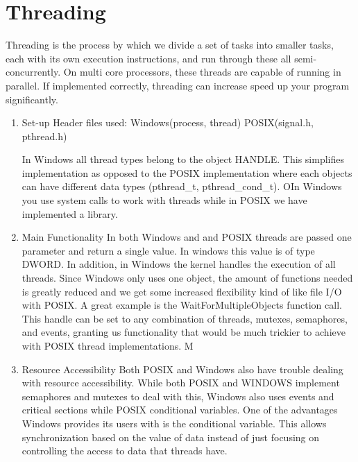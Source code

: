 \documentclass[letterpaper,10pt,titlepage]{article}
\begin{document}
\section{Threading} 
	Threading is the process by which we divide a set of tasks into smaller tasks, each with its own execution instructions, 
and run through these all semi-concurrently. On multi core processors, these threads are capable of running in parallel.
If implemented correctly, threading can increase speed up your program significantly. 

\begin{enumerate}
  \item Set-up \newline
Header files used: Windows(process, thread)			POSIX(signal.h, pthread.h)
	
	In Windows all thread types belong to the object HANDLE. This simplifies implementation as opposed to 
the POSIX implementation where each objects can have different data types (pthread\_t, pthread\_cond\_t). 
OIn Windows you use system calls to work with threads while in POSIX we have implemented a library.


  \item Main Functionality \newline
	In both Windows and and POSIX threads are passed one parameter and return a single value. In windows
this value is of type DWORD. In addition, in Windows the kernel handles the execution of all threads. 
Since Windows only uses one object, the amount of functions needed is greatly reduced
and we get some increased flexibility kind of like file I/O with POSIX. A great example is the WaitForMultipleObjects function call.
This handle can be set to any combination of threads, mutexes, semaphores, and events, granting us functionality that
would be much trickier to achieve with POSIX thread implementations. M

  \item Resource Accessibility \newline
Both POSIX and Windows also have trouble dealing with resource accessibility. While both POSIX
and WINDOWS implement semaphores and mutexes to deal with this, Windows also uses events and critical sections while POSIX 
conditional variables. One of the advantages Windows provides its users with is the conditional variable. This
allows synchronization based on the value of data instead of just focusing on controlling the access
to data that threads have.



\end{enumerate}
\end{document}
